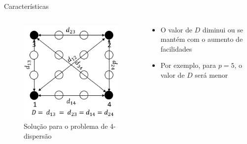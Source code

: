 \documentclass{beamer}
\begin{document}

\begin{frame}{Características}
    \begin{columns} 
    \begin{column}{.5\textwidth}
        \begin{figure}[4-dispersion]
            \centering
            \includegraphics[scale=0.7]{assets/PDispersao/4-dispersion.png}
            \caption{Solução para o problema de 4-dispersão}
            \label{fig:4-dispersion}
        \end{figure}
    \end{column}
    \begin{column}{.5\textwidth}
        \begin{itemize}
            \item O valor de $D$ diminui ou se mantém com o aumento de facilidades
            \item Por exemplo, para $p = 5$, o valor de $D$ será menor
        \end{itemize}
    \end{column}
    
\end{columns}
\end{frame}
\end{document}
